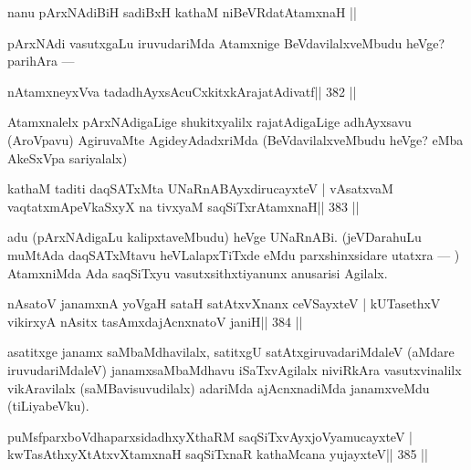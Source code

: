 
\begin{shl}
nanu pArxNAdiBiH sadiBxH kathaM niBeVRdatA\s\s tamxnaH ||
\end{shl}

\begin{artha}
pArxNAdi vasutxgaLu iruvudariMda Atamxnige BeVdavilalxveMbudu heVge? parihAra  {\rm ---} 
\end{artha}

\begin{shl}
nA\s\s tamxneyxVva tadadhAyxsAcuCxkitxkArajatAdivatf\hfill || 382 ||
\end{shl}

\begin{artha}
Atamxnalelx pArxNAdigaLige shukitxyalilx rajatAdigaLige adhAyxsavu (AroVpavu) AgiruvaMte AgideyAdadxriMda (BeVdavilalxveMbudu heVge? eMba AkeSxVpa sariyalalx)
\end{artha}

\begin{shl}
kathaM taditi daqSATxMta UNaRnABAyxdirucayxteV |
vAsatxvaM vaqtatxmApeVkaSxyX na tivxyaM saqSiTxrAtamxnaH\hfill || 383 ||
\end{shl}

\begin{artha}
adu (pArxNAdigaLu kalipxtaveMbudu) heVge UNaRnABi. (jeVDarahuLu muMtAda  daqSATxMtavu heVLalapxTiTxde eMdu parxshinxsidare utatxra  {\rm ---} ) AtamxniMda Ada saqSiTxyu vasutxsithxtiyanunx anusarisi Agilalx.
\end{artha}


\begin{shl}
nAsatoV janamxnA yoVgaH sataH satAtxvXnanx ceVSayxteV |
kUTasethxV vikirxyA nAsitx tasAmxdajAcnxnatoV janiH\hfill || 384 ||
\end{shl}

\begin{artha}
asatitxge janamx saMbaMdhavilalx, satitxgU satAtxgiruvadariMdaleV 
(aMdare iruvuda\-riMdaleV) janamxsaMbaMdhavu iSaTxvAgilalx niviRkAra vasutxvinalilx vikAravilalx (saMBavisu\-vudilalx) adariMda ajAcnxnadiMda janamxveMdu (tiLiyabeVku).
\end{artha}

\begin{shl}
puMsfparxboVdhaparxsidadhxyXthaRM saqSiTxvAyxjoV\s yamucayxteV |
kwTasAthxyXtAtxvXtamxnaH saqSiTxnaR kathaMcana yujayxteV\hfill || 385 ||
\end{shl}

